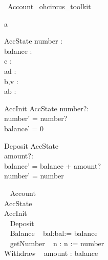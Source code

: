 \begin{zsection}
  \SECTION\ Account \parents\ ohcircus\_toolkit
\end{zsection}

\begin{circus}
  \circchannel a\\
\end{circus}

\begin{schema}{AccState}
\ohcircpublic number : \nat \\
\ohcircprotected balance : \nat \\
\ohcircprotected c : \nat \\
\ohcirclogical ad : \nat \\
\ohcircprivate b,v : \nat \\
ab : \nat
\end{schema}


\begin{schema}{AccInit}
\Delta AccState
number?:\nat\\
\where
number' = number?\\
balance' = 0 
\end{schema}

 
 \begin{schema}{Deposit}
 \Delta AccState\\
 amount?:\nat\\
 \where
 balance' = balance + amount?\\
 number' = number
 \end{schema}

\begin{circus}
  \ohcircclass ~ Account ~ \circdef \circbegin\\  
  \ohcircstate  AccState \\
  \ohcircinitial  AccInit \\
  \ohcircpublic ~ Deposit \\

  \ohcircpublic ~ Balance ~ \circdef  
	\circres bal:\nat \circspot bal:= balance \\

  \ohcircpublic ~ getNumber ~ \circdef 
 	\circres n : \nat \circspot n := number \\

  \ohcircpublic Withdraw ~ \circdef \circval amount : \nat \circspot  balance \prefixcolon [ amount \leq balance , balance' = balance - amount ]\\

\circend
\end{circus}


